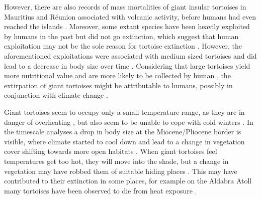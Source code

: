 However, there are also records of mass mortalities of giant insular tortoises in Mauritius and Réunion associated with volcanic activity, before humans had even reached the islands \citep{Cheke2016}. 
Moreover, some extant species have been heavily exploited by humans in the past but did not go extinction, which suggest that human exploitation may not be the sole reason for tortoise extinction \citep{Stiner1999,Steele2005}. 
However, the aforementioned exploitations were associated with medium sized tortoises and did lead to a decrease in body size over time \citep{Stiner1999,Steele2005}.
Considering that large tortoises yield more nutritional value and are more likely to be collected by human \citep{Rhodin2015}, the extirpation of giant tortoises might be attributable to humans, possibly in conjunction with climate change \citep{Cione2003}.

Giant tortoises seem to occupy only a small temperature range, as they are in danger of overheating \citep{Swingland1979,Schleich1981}, but also seem to be unable to cope with cold winters \citep{Hibbard1960}. In the timescale analyses a drop in body size at the Miocene/Pliocene border is visible, where climate started to cool down and lead to a change in vegetation cover shifting towards more open habitats \citep{Domingo2009}. When giant tortoises feel temperatures get too hot, they will move into the shade, but a change in vegetation may have robbed them of suitable hiding places \citep{Sturbaum1982,Hunter2013, Cheke2016, Schleich1981,Lujan2014}. This may have contributed to their extinction in some places, for example on the Aldabra Atoll many tortoises have been observed to die from heat exposure \citep{Swingland1979, Swingland1979a}.






